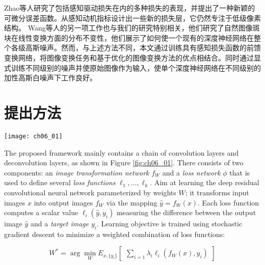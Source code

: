 Zhao等人\cite{Zhao2015}研究了包括感知驱动损失在内的多种损失的表现，并提出了一种新颖的可微分误差函数。从感知动机指标设计出一些新的损失层，它仍然专注于低级像素结构。
Wang等人的另一项工作\cite{Wang2014a}也与我们的研究特别相关，他们研究了自然图像斑块在线性变换方面的分布不变性，他们展示了如何使一个现有的深度神经网络在整个各级高斯噪声。然而，与上述方法不同，本文通过训练具有感知损失函数的前馈变换网络，将图像变换任务和基于优化的图像变换方法的优点相结合。同时通过显式训练不同级别的噪声并使原始图像作为输入，使单个深度神经网络在不同级别的加性高斯白噪声下工作良好。
\section{提出方法} 

\label{sec:method}
\begin{figure*}
\vspace{-6mm}
\centering
\texttt{[image: ch06\_01]}
\caption{The overall architecture of our proposed network.
    The image transformation network contains layers of convolution (encoder)  and deconvolution (decoder). We use a loss network pretrained for image classification to define perceptual loss functions that measure perceptual differences in output and ground truth label. The loss network remains fixed during the training process.}
\label{fig:ch06_01}
\vspace{-10mm}
\end{figure*}
 

The proposed framework mainly contains a chain of convolution layers and deconvolution layers, as shown in Figure \ref{fig:ch06_01}. There consists of two components: an \emph{image transformation network} $f_W$ and a \emph{loss network} $\phi$ that is used to define several \emph{loss functions} $\ell_1,\ldots,\ell_k$. Aim at learning the deep residual convolutional neural network parameterized by weights $W$; it transforms input images $x$ into output images $f_W$ via the mapping $\hat y = f_W(x)$. 
Each loss function computes a scalar value $\ell_i(\hat y, y_i)$ measuring the difference between the output image $\hat y$ and a \emph{target image} $y_i$. Learning objective is trained using stochastic gradient descent to minimize a weighted combination of loss functions:

\begin{equation}
   W^* = \arg\min_W E_{x, \{y_i\}}\begin{bmatrix}
\sum_{i=1} \lambda_i \ell_i(f_W(x), y_i)
\end{bmatrix}
\end{equation}

